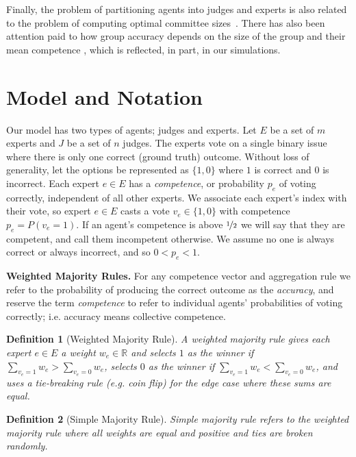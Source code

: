 \documentclass[letterpaper]{article} %
\newtheorem{definition}{Definition}
\newcommand{\judges}{\ensuremath{J} }
\newcommand{\experts}{\ensuremath{E} }
\newcommand{\expert}{\ensuremath{e} }
\newcommand{\vote}{\ensuremath{v} }
\begin{document}
Finally, the problem of partitioning agents into judges and experts is also related to the problem of computing optimal committee sizes~\cite{magdon2018mathematical,revel2021optimal}. 
%
There has also been attention paid to how group accuracy depends on the size of the group and their mean competence \cite{grofman1978judgmental,grofman1984group}, which is reflected, in part, in our simulations.

\section{Model and Notation}
Our model has two types of agents; judges and experts. 
Let \experts be a set of $m$ experts and \judges be a set of $n$ judges.
%
The experts vote on a single binary issue where there is only one correct (ground truth) outcome. Without loss of generality, let the options be represented as $\{1,0\}$ where $1$ is correct and $0$ is incorrect. 
%
Each expert $\expert \in \experts$ has a \emph{competence}, or probability $p_\expert$ of voting correctly, independent of all other experts.
%
We associate each expert's index with their vote, so expert $\expert \in \experts$ casts a vote $\vote_\expert \in \{1,0\}$ with competence $p_\expert = P(\vote_\expert = 1)$. 
%
If an agent's competence is above $\nicefrac{1}{2}$ we will say that they are competent, and call them incompetent otherwise.
%
We assume no one is always correct or always incorrect, and so $0 < p_\expert < 1$.
%


\vspace{0.2cm}
\noindent
\textbf{Weighted Majority Rules.\;}
For any competence vector and aggregation rule we refer to the probability of producing the correct outcome as the \emph{accuracy}, and reserve the term \emph{competence} to refer to individual agents' probabilities of voting correctly; i.e. accuracy means collective competence.

\begin{definition}[Weighted Majority Rule]
A weighted majority rule gives each expert $\expert \in \experts$ a weight $w_\expert \in \mathbb{R}$ and selects $1$ as the winner if $\sum\limits_{\vote_\expert = 1} w_\expert > \sum\limits_{\vote_\expert = 0} w_\expert$, selects $0$ as the winner if $\sum\limits_{\vote_\expert = 1} w_\expert < \sum\limits_{\vote_\expert = 0} w_\expert$, and uses a tie-breaking rule (e.g. coin flip) for the edge case where these sums are equal.
\end{definition}

\begin{definition}[Simple Majority Rule]
Simple majority rule refers to the weighted majority rule where all weights are equal and positive and ties are broken randomly.
\end{definition}
\end{document}
